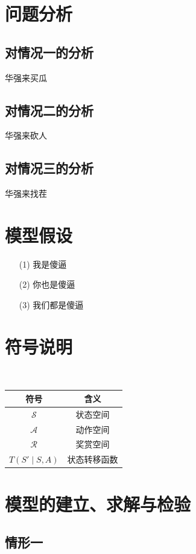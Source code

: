 \documentclass[]{article}
\begin{document}
\section{问题分析}

\subsection{对情况一的分析}
\indent 华强来买瓜
\subsection{对情况二的分析}
\indent 华强来砍人
\subsection{对情况三的分析}
\indent 华强来找茬

\section{模型假设}

\begin{itemize}
    \item[(1)] 我是傻逼
    \item[(2)] 你也是傻逼
    \item[(3)] 我们都是傻逼
\end{itemize}

\section{符号说明}
~\\
\begin{table}[!h]
\centering
    \begin{tabular}{c|c}
    \hline
    \large{符号} & \large{含义} \\ 
    \hline
    $\mathcal{S}$ & 状态空间 \\
    $\mathcal{A}$ & 动作空间 \\
    $\mathcal{R}$ & 奖赏空间 \\
    $T(S' \mid S,A)$ & 状态转移函数 \\
    \hline
    \end{tabular}
\end{table}

\section{模型的建立、求解与检验}
\subsection{情形一}
\end{document}

